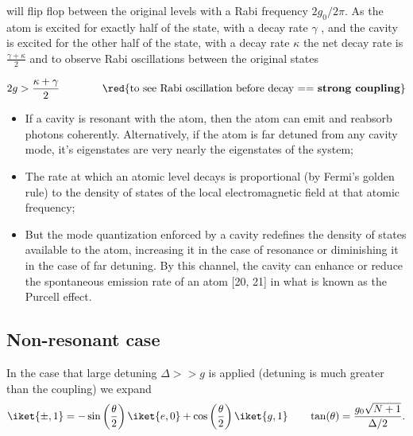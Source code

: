  \noindent  will flip  flop between  the original  levels with  a Rabi  frequency
 $ 2g_0/2\pi  $. As the  atom is excited  for exactly half  of the state,  with a
 decay rate  $ \gamma $  , and the  cavity is excited for  the other half  of the
 state,   with   a   decay   rate   $   \kappa  $   the   net   decay   rate   is
 $  \frac{\gamma+\kappa}{2}  $  and  to observe  Rabi  oscillations  between  the
 original states

 \[
   2g  > \frac{\kappa+\gamma}{2}  \qquad\qquad\text{\red{to see  Rabi oscillation
       before decay == \textbf{strong coupling}}}
 \]

 \begin{framed}\noindent
   \begin{itemize}
   \item  If a  cavity is  resonant with  the atom,  then the  atom can  emit and
     reabsorb photons coherently.  Alternatively, if the atom is far detuned from
     any cavity  mode, it’s eigenstates  are very  nearly the eigenstates  of the
     system;
   \item The  rate at which  an atomic level  decays is proportional  (by Fermi’s
     golden rule) to the density of  states of the local electromagnetic field at
     that atomic frequency;
   \item But the mode quantization enforced  by a cavity redefines the density of
     states available  to the  atom, increasing  it in the  case of  resonance or
     diminishing it in the case of far detuning.  By this channel, the cavity can
     enhance or reduce the spontaneous emission rate  of an atom [20, 21] in what
     is known as the Purcell effect.
   \end{itemize}
 \end{framed}

 \subsection{Non-resonant case}\label{sec:stark-shift}

 \begin{framed}\noindent
   In the  case that large  detuning $\Delta >> g$  is applied (detuning  is much
   greater than the coupling) we expand
   \begin{equation}
     \iket{\pm,1}      =     -\sin\left( \frac{\theta}{2} \right)\iket{e,0}     +
     \cos\left( \frac{\theta}{2} \right)\iket{g,1} \qquad \tan(\theta)     =
     \frac{g_0\sqrt{N+1}}{\Delta/2}.
   \end{equation}
   \noindent
 \end{framed}

